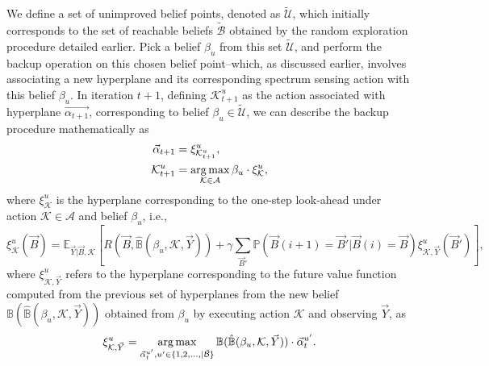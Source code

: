 We define a set of unimproved belief points, denoted as $\tilde{\mathcal{U}}$, which initially corresponds to the set of reachable beliefs $\tilde{\mathcal{B}}$ obtained by the random exploration procedure detailed earlier. Pick a belief $\beta_{u}$ from this set $\tilde{\mathcal{U}}$, and perform the backup operation on this chosen belief point--which, as discussed earlier, involves associating a new hyperplane and its corresponding spectrum sensing action with this belief $\beta_{u}$. In iteration $t+1$, defining $\mathcal{K}_{t+1}^{u}$ as the action associated with hyperplane $\vec{\alpha_{t+1}}$, corresponding to belief $\beta_{u}{\in}\tilde{\mathcal{U}}$, we can describe the backup procedure mathematically as
\begin{equation}\label{25}
    \begin{aligned}
        \vec{\alpha}_{t+1}&=\xi_{\mathcal{K}_{t+1}^{u}}^{u},\\
        \mathcal{K}_{t+1}^{u}&=\operatorname*{arg\,max}_{\mathcal{K} \in \mathcal{A}}\beta_{u} \cdot \xi_{\mathcal{K}}^{u},
    \end{aligned}
\end{equation}
where $\xi_{\mathcal{K}}^{u}$ is the hyperplane corresponding to the one-step look-ahead under action $\mathcal{K}{\in}\mathcal{A}$ and belief $\beta_{u}$, i.e.,
\begin{equation}\label{26}
    \xi_{\mathcal{K}}^{u}(\vec{B})=\mathbb{E}_{\vec{Y}|\vec{B},\mathcal{K}}\left[R(\vec{B},\hat{\mathbb{B}}(\beta_{u},\mathcal{K},\vec{Y}))+\gamma \sum_{\vec{B}'}\mathbb{P}(\vec{B}(i+1)=\vec{B}'|\vec{B}(i)=\vec{B})\xi_{\mathcal{K},\vec{Y}}^{u}(\vec{B}')\right],
\end{equation}
where $\xi_{\mathcal{K},\vec{Y}}^{u}$ refers to the hyperplane corresponding to the future value function computed from the previous set of hyperplanes from the new belief $\mathbb{B}(\hat{\mathbb{B}}(\beta_{u},\mathcal{K},\vec{Y}))$ obtained from $\beta_{u}$ by executing action $\mathcal{K}$ and observing $\vec{Y}$, as
\begin{equation}\label{27}
    \xi_{\mathcal{K},\vec{Y}}^{u}=\operatorname*{arg\,max}_{\vec{\alpha}_{t}^{u'},u' \in \{1,2,\dots,|\tilde{\mathcal{B}}\}}\mathbb{B}(\hat{\mathbb{B}}(\beta_{u},\mathcal{K},\vec{Y})) \cdot \vec{\alpha}_{t}^{u'}.
\end{equation}

